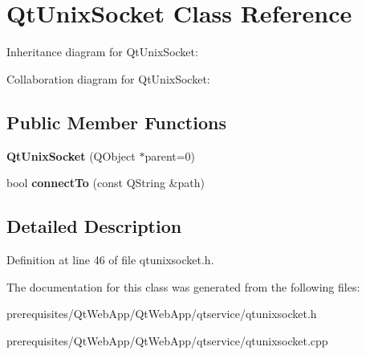 \hypertarget{class_qt_unix_socket}{}\section{Qt\+Unix\+Socket Class Reference}
\label{class_qt_unix_socket}


Inheritance diagram for Qt\+Unix\+Socket\+:


Collaboration diagram for Qt\+Unix\+Socket\+:
\subsection*{Public Member Functions}
\begin{DoxyCompactItemize}
\item 
\mbox{\label{class_qt_unix_socket_a5c8729be0bb51069bc5011c131a3c396}} 
{\bfseries Qt\+Unix\+Socket} (Q\+Object $\ast$parent=0)
\item 
\mbox{\label{class_qt_unix_socket_a412e4407c955f2cfceabdae69f1626ff}} 
bool {\bfseries connect\+To} (const Q\+String \&path)
\end{DoxyCompactItemize}


\subsection{Detailed Description}


Definition at line 46 of file qtunixsocket.\+h.



The documentation for this class was generated from the following files\+:\begin{DoxyCompactItemize}
\item 
prerequisites/\+Qt\+Web\+App/\+Qt\+Web\+App/qtservice/qtunixsocket.\+h\item 
prerequisites/\+Qt\+Web\+App/\+Qt\+Web\+App/qtservice/qtunixsocket.\+cpp\end{DoxyCompactItemize}
